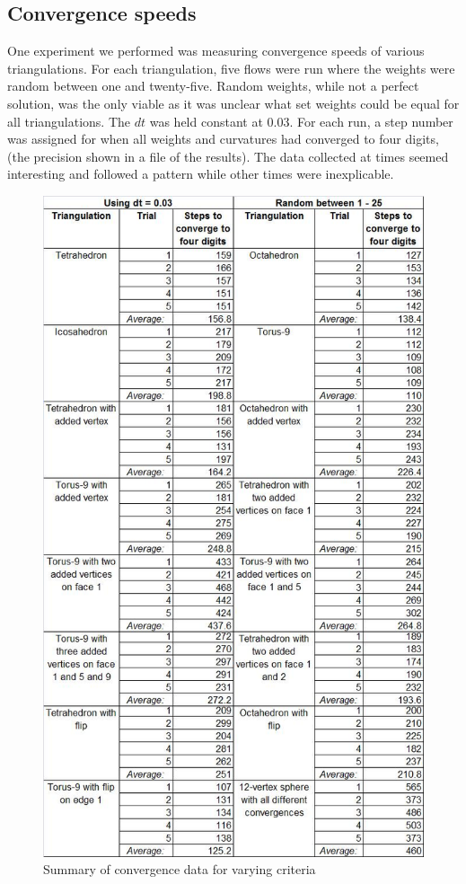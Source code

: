 \documentclass[12pt]{article}
\begin{document}
\subsection{Convergence speeds}

One experiment we performed was measuring convergence speeds of various triangulations. For each triangulation, five flows were run where the weights were random between one and twenty-five. Random weights, while not a perfect solution, was the only viable as it was unclear what set weights could be equal for all triangulations. The $dt$ was held constant at 0.03. For each run, a step number was assigned for when all weights and curvatures had converged to four digits, (the precision shown in a file of the results).  The data collected at times seemed interesting and followed a pattern while other times were inexplicable.\newline

\begin{figure}
\centering
\includegraphics[scale = 0.79]{ConvergenceTable.png}
\caption{Summary of convergence data for varying criteria}
\label{fig:conv}
\end{figure}
\end{document}
